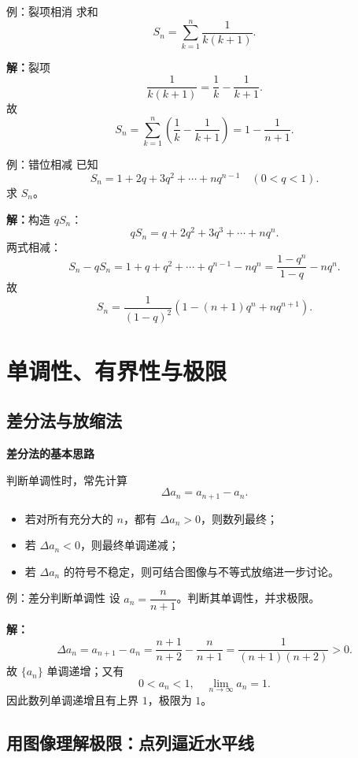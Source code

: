 \documentclass[a4paper,11pt]{ctexart}
\newcommand{\SeqGuideMiniHeading}[1]{%
  \par\smallskip
  \noindent\textbf{#1}\par\smallskip
}
\begin{document}
\begin{examplebox}{例：裂项相消}
  求和
  \[
    S_n=\sum_{k=1}^{n}\frac{1}{k(k+1)}.
  \]

  \textbf{解：}裂项
  \[
    \frac{1}{k(k+1)}=\frac{1}{k}-\frac{1}{k+1}.
  \]
  故
  \[
    S_n=\sum_{k=1}^{n}\left(\frac{1}{k}-\frac{1}{k+1}\right)
      =1-\frac{1}{n+1}.
  \]
\end{examplebox}

\begin{examplebox}{例：错位相减}
  已知
  \[
    S_n=1+2q+3q^2+\cdots+nq^{n-1}\quad(0<q<1).
  \]
  求 $S_n$。

  \textbf{解：}构造 $qS_n$：
  \[
    qS_n = q+2q^2+3q^3+\cdots+nq^{n}.
  \]
  两式相减：
  \[
    S_n-qS_n = 1+q+q^2+\cdots+q^{n-1}-nq^{n}
    =\frac{1-q^{n}}{1-q}-nq^{n}.
  \]
  故
  \[
    S_n=\frac{1}{(1-q)^2}\left(1-(n+1)q^{n}+nq^{n+1}\right).
  \]
\end{examplebox}

\clearpage
\section{单调性、有界性与极限}

\subsection{差分法与放缩法}

\SeqGuideMiniHeading{差分法的基本思路}
判断单调性时，常先计算
\[
  \Delta a_n = a_{n+1}-a_n.
\]
\begin{itemize}
  \item 若对所有充分大的 $n$，都有 $\Delta a_n>0$，则数列最终；
  \item 若 $\Delta a_n<0$，则最终单调递减；
  \item 若 $\Delta a_n$ 的符号不稳定，则可结合图像与不等式放缩进一步讨论。
\end{itemize}

\begin{examplebox}{例：差分判断单调性}
  设 $a_n=\dfrac{n}{n+1}$。判断其单调性，并求极限。

  \textbf{解：}
  \[
    \Delta a_n = a_{n+1}-a_n=\frac{n+1}{n+2}-\frac{n}{n+1}
    =\frac{1}{(n+1)(n+2)}>0.
  \]
  故 $\{a_n\}$ 单调递增；又有
  \[
    0<a_n<1,\quad \lim_{n\to\infty}a_n=1.
  \]
  因此数列单调递增且有上界 $1$，极限为 $1$。
\end{examplebox}

\subsection{用图像理解极限：点列逼近水平线}
\end{document}
